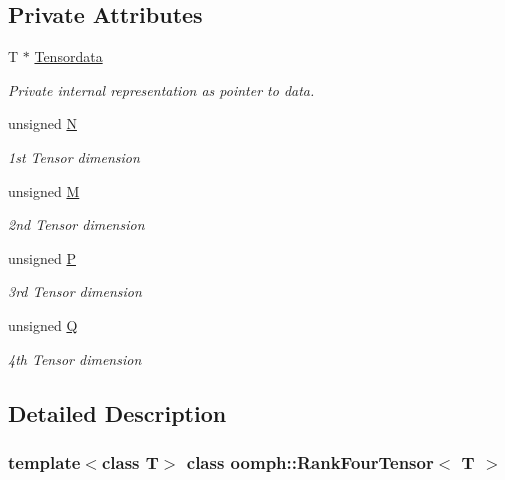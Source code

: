 \subsection*{Private Attributes}
\begin{DoxyCompactItemize}
\item 
T $\ast$ \hyperlink{classoomph_1_1RankFourTensor_a4e195572c01989507a4be4cfdcd26210}{Tensordata}
\begin{DoxyCompactList}\small\item\em Private internal representation as pointer to data. \end{DoxyCompactList}\item 
unsigned \hyperlink{classoomph_1_1RankFourTensor_a122b61b1b83d3a8df6976e735b89244c}{N}
\begin{DoxyCompactList}\small\item\em 1st Tensor dimension \end{DoxyCompactList}\item 
unsigned \hyperlink{classoomph_1_1RankFourTensor_a0f0e34937940e082dbba6b95383086d5}{M}
\begin{DoxyCompactList}\small\item\em 2nd Tensor dimension \end{DoxyCompactList}\item 
unsigned \hyperlink{classoomph_1_1RankFourTensor_ad7c18005b6cb68643c2718e67dd6a0d7}{P}
\begin{DoxyCompactList}\small\item\em 3rd Tensor dimension \end{DoxyCompactList}\item 
unsigned \hyperlink{classoomph_1_1RankFourTensor_ae62059ee0897816d899c266ad6c03c8b}{Q}
\begin{DoxyCompactList}\small\item\em 4th Tensor dimension \end{DoxyCompactList}\end{DoxyCompactItemize}


\subsection{Detailed Description}
\subsubsection*{template$<$class T$>$\newline
class oomph\+::\+Rank\+Four\+Tensor$<$ T $>$}

